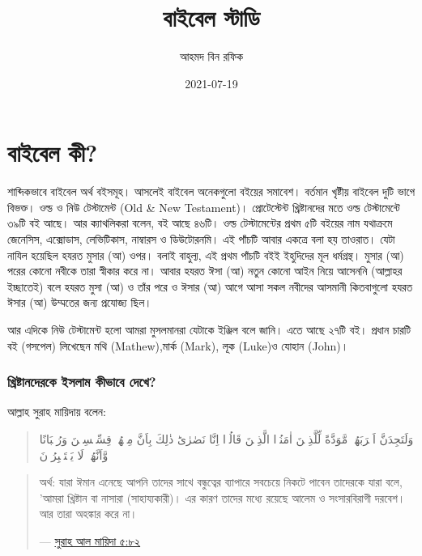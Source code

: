 \documentclass[
]{book}
\title{বাইবেল স্টাডি}
\author{আহমদ বিন রফিক}
\date{2021-07-19}
\begin{document}
\maketitle

{
\setcounter{tocdepth}{1}
\tableofcontents
}
\hypertarget{about-bible}{%
\chapter*{বাইবেল কী?}\label{about-bible}}

শাব্দিকভাবে বাইবেল অর্থ বইসমূহ। আসলেই বাইবেল অনেকগুলো বইয়ের সমাবেশ। বর্তমান খৃষ্টীয় বাইবেল দুটি ভাগে বিভক্ত। ওল্ড ও নিউ টেস্টামেন্ট (Old \& New Testament)। প্রোটেস্টেন্ট খ্রিষ্টানদের মতে ওল্ড টেস্টামেন্টে ৩৯টি বই আছে। আর ক্যাথলিকরা বলেন, বই আছে ৪৬টি। ওল্ড টেস্টামেন্টের প্রথম ৫টি বইয়ের নাম যথাক্রমে জেনেসিস, এক্সোডাস, লেভিটিকাস, নাম্বারস ও ডিউটোরনমি। এই পাঁচটি আবার একত্রে বলা হয় তাওরাত। যেটা নাযিল হয়েছিল হযরত মুসার (আ) ওপর। বলাই বাহুল্য, এই প্রথম পাঁচটি বইই ইহুদিদের মূল ধর্মগ্রন্থ। মুসার (আ) পরের কোনো নবীকে তারা স্বীকার করে না। আবার হযরত ঈসা (আ) নতুন কোনো আইন নিয়ে আসেননি (আল্লাহর ইচ্ছাতেই) বলে হযরত মুসা (আ) ও তাঁর পরে ও ঈসার (আ) আগে আসা সকল নবীদের আসমানী কিতবাগুলো হযরত ঈসার (আ) উম্মতের জন্য প্রযোজ্য ছিল।

আর এদিকে নিউ টেস্টামেন্ট হলো আমরা মুসলমানরা যেটাকে ইঞ্জিল বলে জানি। এতে আছে ২৭টি বই। প্রধান চারটি বই (গসপেল) লিখেছেন মথি (Mathew),মার্ক (Mark), লূক (Luke)ও যোহান (John)।

\hypertarget{islam-on-christians}{%
\subsection*{খ্রিষ্টানদেরকে ইসলাম কীভাবে দেখে?}\label{islam-on-christians}}

আল্লাহ সুরাহ মায়িদায় বলেন:

\begin{quote}
وَلَتَجِدَنَّ اَقۡرَبَهُمۡ مَّوَدَّةً لِّلَّذِيۡنَ اٰمَنُوۡا الَّذِيۡنَ قَالُوۡۤا اِنَّا نَصٰرٰى‌ؕ ذٰلِكَ بِاَنَّ مِنۡهُمۡ قِسِّيۡسِيۡنَ وَرُهۡبَانًا وَّاَنَّهُمۡ لَا يَسۡتَكۡبِرُوۡنَ
\end{quote}

\begin{quote}
অর্থ: যারা ঈমান এনেছে আপনি তাদের সাথে বন্ধুত্বের ব্যাপারে সবচেয়ে নিকটে পাবেন তাদেরকে যারা বলে, 'আমরা খ্রিষ্টান বা নাসারা (সাহায্যকারী)। এর কারণ তাদের মধ্যে রয়েছে আলেম ও সংসারবিরাগী দরবেশ। আর তারা অহঙ্কার করে না।

--- \href{http://tafheembangla.com/index.php/quran?show=quran\&surah_no=5\&limitstart=81}{সুরাহ আল মায়িদা ৫:৮২}
\end{quote}
\end{document}

